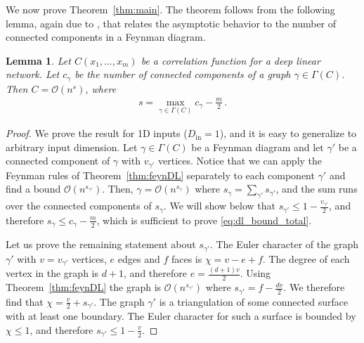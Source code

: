 \documentclass[english]{article}
\newtheorem{lemma}{Lemma}
\newcommand{\cO}{\ensuremath{\mathcal{O}}}
\newcommand{\Din}{\ensuremath{D_{\mathrm{in}}}}
\begin{document}
We now prove Theorem~\ref{thm:main}.
The theorem follows from the following lemma, again due to \cite{tHooft:1973alw}, that relates the asymptotic behavior to the number of connected components in a Feynman diagram.
\begin{lemma}\label{lemma:asympBound}
  Let $C(x_1,\dots,x_m)$ be a correlation function for a deep linear network.
  Let $c_\gamma$ be the number of connected components of a graph $\gamma \in \Gamma(C)$. 
  Then $C = \cO(n^s)$, where
  \begin{align}
    s = \max_{\gamma \in \Gamma(C)} c_\gamma - \frac{m}{2} \,. \label{eq:dl_bound_total}
  \end{align}
\end{lemma}
\begin{proof}
We prove the result for 1D inputs ($\Din=1$), and it is easy to generalize to arbitrary input dimension.
Let $\gamma \in \Gamma(C)$ be a Feynman diagram and let $\gamma'$ be a connected component of $\gamma$ with $v_{\gamma'}$ vertices.
Notice that we can apply the Feynman rules of Theorem~\ref{thm:feynDL} separately to each component $\gamma'$ and find a bound $\cO(n^{s_{\gamma'}})$.
Then, $\gamma = \cO(n^{s_\gamma})$ where $s_\gamma = \sum_{\gamma'} s_{\gamma'}$, and the sum runs over the connected components of $s_\gamma$.
We will show below that $s_{\gamma'} \le 1 - \frac{v_{\gamma'}}{2}$, and therefore $s_\gamma \le c_\gamma - \frac{m}{2}$, which is sufficient to prove \eqref{eq:dl_bound_total}.

Let us prove the remaining statement about $s_{\gamma'}$.
The Euler character of the graph $\gamma'$ with $v=v_{\gamma'}$ vertices, $e$ edges and $f$ faces is $\chi = v - e + f$.
The degree of each vertex in the graph is $d+1$, and therefore $e = \frac{(d+1)v}{2}$.
Using Theorem~\ref{thm:feynDL} the graph is $\cO(n^{s_{\gamma'}})$ where $s_{\gamma'} = f - \frac{dv}{2}$.
We therefore find that $\chi = \frac{v}{2} + s_{\gamma'}$.
The graph $\gamma'$ is a triangulation of some connected surface with at least one boundary.
The Euler character for such a surface is bounded by $\chi \le 1$, and therefore $s_{\gamma'} \le 1 - \frac{v}{2}$.
\end{proof}
\end{document}
